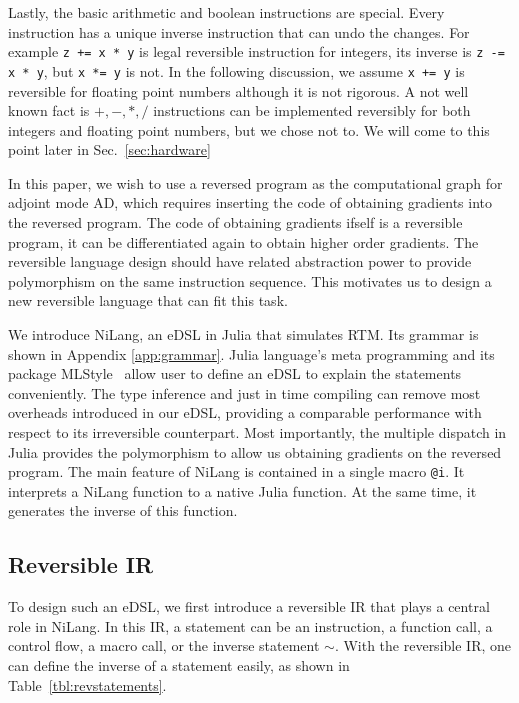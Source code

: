 \documentclass[aps,twocolumn,longbibliography,english,superscriptaddress]{revtex4-1}
\newcommand{\<}{\langle}
\renewcommand{\>}{\rangle}
\newcommand{\Tbl}[1]{Table~\ref{#1}}
\newcommand{\Sec}[1]{Sec.~\ref{#1}}
\newcommand{\App}[1]{Appendix \ref{#1}}
\theoremstyle{definition}\newtheorem{definition}{\textit{Definition}}
\begin{document}
Lastly, the basic arithmetic and boolean instructions are special. Every instruction has a unique inverse instruction that can undo the changes.
For example \texttt{z += x * y} is legal reversible instruction for integers, its inverse is \texttt{z -= x * y}, but \texttt{x *= y} is not.
In the following discussion, we assume \texttt{x += y} is reversible for floating point numbers although it is not rigorous.
A not well known fact is $+, -, *, /$ instructions can be implemented reversibly for both integers and floating point numbers, but we chose not to.
We will come to this point later in \Sec{sec:hardware}

In this paper, we wish to use a reversed program as the computational graph for adjoint mode AD, which requires inserting the code of obtaining gradients into the reversed program.
The code of obtaining gradients ifself is a reversible program, it can be differentiated again to obtain higher order gradients.
The reversible language design should have related abstraction power to provide polymorphism on the same instruction sequence.
This motivates us to design a new reversible language that can fit this task.

We introduce NiLang, an eDSL in Julia that simulates RTM. Its grammar is shown in \App{app:grammar}.
Julia language's meta programming and its package MLStyle~\cite{MLStyle} allow user to define an eDSL to explain the statements conveniently.
The type inference and just in time compiling can remove most overheads introduced in our eDSL, providing a comparable performance with respect to its irreversible counterpart. Most importantly, the multiple dispatch in Julia provides the polymorphism to allow us obtaining gradients on the reversed program.
The main feature of NiLang is contained in a single macro \texttt{@i}. It interprets a NiLang function to a native Julia function.
At the same time, it generates the inverse of this function.

\subsection{Reversible IR}
To design such an eDSL, we first introduce a reversible IR that plays a central role in NiLang.
In this IR, a statement can be an instruction, a function call, a control flow, a macro call, or the inverse statement $\sim$.
With the reversible IR, one can define the inverse of a statement easily, as shown in \Tbl{tbl:revstatements}.
\end{document}
